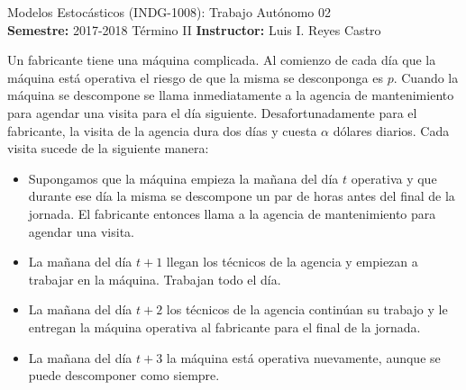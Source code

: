 \documentclass[ a4paper, twoside, 11pt]{article}
\newcommand{\numero}{02}
\begin{document}
\allowdisplaybreaks



\begin{center}
\Large Modelos Estoc\'asticos (INDG-1008): Trabajo Aut\'onomo \numero \\[1ex]
\small \textbf{Semestre:} 2017-2018 T\'ermino II \qquad
\textbf{Instructor:} Luis I. Reyes Castro
\end{center}
\fullskip

%
\halfskip

\begin{problem}
\label{prob:maquina-caprichosa}
Un fabricante tiene una m\'aquina complicada. Al comienzo de cada d\'ia que la m\'aquina est\'a operativa el riesgo de que la misma se desconponga es $p$. Cuando la m\'aquina se descompone se llama inmediatamente a la agencia de mantenimiento para agendar una visita para el d\'ia siguiente. Desafortunadamente para el fabricante, la visita de la agencia dura \linebreak dos d\'ias y cuesta $\alpha$ d\'olares diarios. Cada visita sucede de la siguiente manera: 
\begin{itemize}
\item Supongamos que la m\'aquina empieza la ma\~nana del d\'ia $t$ operativa y que durante ese d\'ia la misma se descompone un par de horas antes del final de la jornada. El fabricante entonces llama a la agencia de mantenimiento para agendar una visita. 
\item La ma\~nana del d\'ia $t+1$ llegan los t\'ecnicos de la agencia y empiezan a trabajar en la m\'aquina. Trabajan todo el d\'ia. 
\item La ma\~nana del d\'ia $t+2$ los t\'ecnicos de la agencia contin\'uan su trabajo y le entregan la m\'aquina operativa al fabricante para el final de la jornada. 
\item La ma\~nana del d\'ia $t+3$ la m\'aquina est\'a operativa nuevamente, aunque se puede descomponer como siempre. 
\end{itemize}


\end{problem}
\end{document}
